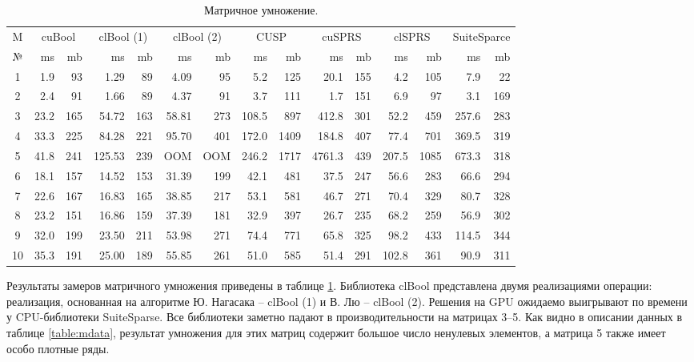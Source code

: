 \documentclass[14pt]{extarticle}
\begin{document}
	\begin{table}
	\centering
	\scriptsize
	\begin{tabular}{ |c|r r|r r|r r|r r|r r|r r|r r|} 
		\hline
		M  & \multicolumn{2}{c|}{cuBool} & \multicolumn{2}{c|}{clBool (1)} & \multicolumn{2}{c|}{clBool (2)} &
		 \multicolumn{2}{c|}{CUSP} &  \multicolumn{2}{c|}{cuSPRS} & 
		  \multicolumn{2}{c||}{clSPRS} & \multicolumn{2}{c|}{SuiteSparce}\\
		 № & ms  & mb &  ms  & mb  &  ms  & mb &  ms  & mb &  ms  & mb  &  ms  & mb &  ms  & mb \\
		\hline
		1 & 1.9 & 93 & 1.29  & 89 & 4.09 & 95 & 5.2  & 125 & 20.1 & 155 & 4.2 & 105 & 7.9  & 22  \\ %
	 	2 & 2.4  & 91  & 1.66   & 89  & 4.37 & 91 & 3.7   & 111  & 1.7    & 151 & 6.9   & 97   & 3.1   & 169 \\ %
		 3 & 23.2 & 165 & 54.72  & 163 & 58.81 & 273 & 108.5 & 897  & 412.8  & 301 & 52.2  & 459  & 257.6 & 283 \\ %
		 4 & 33.3 & 225 & 84.28  & 221 & 95.70 & 401 & 172.0 & 1409 & 184.8  & 407 & 77.4  & 701  & 369.5 & 319 \\ %
		 5 & 41.8 & 241 & 125.53 & 239 & OOM & OOM & 246.2 & 1717 & 4761.3 & 439 & 207.5 & 1085 & 673.3 & 318 \\ %
		6 & 18.1 & 157 & 14.52  & 153 & 31.39 & 199 & 42.1  & 481  & 37.5   & 247 & 56.6  & 283  & 66.6  & 294 \\ %
		 7 & 22.6 & 167 & 16.83  & 165 & 38.85 & 217 & 53.1  & 581  & 46.7   & 271 & 70.4  & 329  & 80.7  & 328 \\ %
		 8 & 23.2 & 151 & 16.86  & 159 & 37.39 & 181 & 32.9  & 397  & 26.7   & 235 & 68.2  & 259  & 56.9  & 302 \\ %
		 9 & 32.0 & 199 & 23.50  & 211 & 53.98 & 271 & 74.4  & 771  & 65.8   & 325 & 98.2  & 433  & 114.5 & 344 \\ %
		 10 & 35.3 & 191 & 25.00  & 189 & 55.85 & 261 & 51.0  & 585  & 51.4   & 291 & 102.8 & 361  & 90.9  & 311 \\ %
		 \hline
 
	\end{tabular}
	\caption{Матричное умножение.}
	\label{table:mult}
	\end{table}
	
	
	Результаты замеров матричного умножения приведены в таблице \ref{table:mult}. Библиотека clBool представлена двумя реализациями операции: реализация, основанная на алгоритме Ю. Нагасака -- clBool (1) и В. Лю -- clBool (2). Решения на GPU ожидаемо выигрывают по времени у CPU-библиотеки SuiteSparse. Все библиотеки заметно падают в производительности на матрицах 3--5. Как видно в описании данных в таблице \ref{table:mdata}, результат умножения для этих матриц содержит большое число ненулевых элементов, а матрица 5 также имеет особо плотные ряды. 
	
\end{document}
